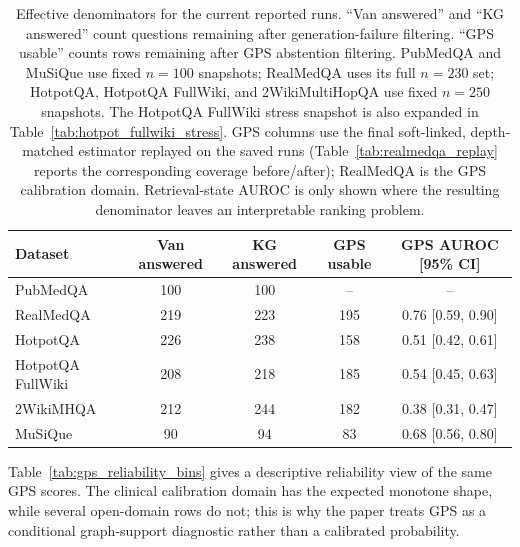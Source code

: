 \begin{table}[t]
\centering
\small
\caption{Effective denominators for the current reported runs.
``Van answered'' and ``KG answered'' count questions remaining after
generation-failure filtering.
``GPS usable'' counts rows remaining after GPS abstention filtering.
PubMedQA and MuSiQue use fixed $n=100$ snapshots; RealMedQA uses its full
$n=230$ set; HotpotQA, HotpotQA FullWiki, and 2WikiMultiHopQA use fixed
$n=250$ snapshots.
The HotpotQA FullWiki stress snapshot is also expanded in
Table~\ref{tab:hotpot_fullwiki_stress}.
GPS columns use the final soft-linked, depth-matched estimator replayed
on the saved runs (Table~\ref{tab:realmedqa_replay} reports the corresponding
coverage before/after); RealMedQA is the GPS calibration domain.
Retrieval-state AUROC is only shown where the resulting denominator leaves an
interpretable ranking problem.
\label{tab:effective_denominators}}
\begin{tabular}{@{}lcccc@{}}
\toprule
Dataset & Van answered & KG answered & GPS usable & GPS AUROC [95\% CI] \\
\midrule
PubMedQA & 100 & 100 & -- & -- \\
RealMedQA & 219 & 223 & 195 & 0.76 [0.59, 0.90] \\
HotpotQA & 226 & 238 & 158 & 0.51 [0.42, 0.61] \\
HotpotQA FullWiki & 208 & 218 & 185 & 0.54 [0.45, 0.63] \\
2WikiMHQA & 212 & 244 & 182 & 0.38 [0.31, 0.47] \\
MuSiQue & 90 & 94 & 83 & 0.68 [0.56, 0.80] \\
\bottomrule
\end{tabular}
\end{table}

Table~\ref{tab:gps_reliability_bins} gives a descriptive reliability view of
the same GPS scores.
The clinical calibration domain has the expected monotone shape, while several
open-domain rows do not; this is why the paper treats GPS as a conditional
graph-support diagnostic rather than a calibrated probability.



